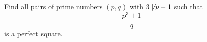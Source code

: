 Find all pairs of prime numbers $(p,q)$ with $3\not\mid p+1$ such that
$$\frac{p^3 + 1}{q}$$
is a perfect square.
